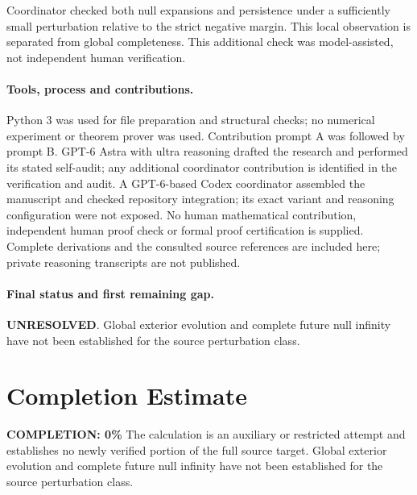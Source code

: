 \documentclass[11pt]{article}
\begin{document}
Coordinator checked both null expansions and persistence under a sufficiently small perturbation relative to the strict negative margin. This local observation is separated from global completeness. This additional check was model-assisted, not independent human verification.

\paragraph{Tools, process and contributions.}
Python 3 was used for file preparation and structural checks; no numerical experiment or theorem prover was used. Contribution prompt A was followed by prompt B. GPT-6 Astra with ultra reasoning drafted the research and performed its stated self-audit; any additional coordinator contribution is identified in the verification and audit. A GPT-6-based Codex coordinator assembled the manuscript and checked repository integration; its exact variant and reasoning configuration were not exposed. No human mathematical contribution, independent human proof check or formal proof certification is supplied. Complete derivations and the consulted source references are included here; private reasoning transcripts are not published.

\paragraph{Final status and first remaining gap.}
\textbf{UNRESOLVED}. Global exterior evolution and complete future null infinity have not been established for the source perturbation class.

\section{Completion Estimate}
\noindent\textbf{COMPLETION: 0\%}
The calculation is an auxiliary or restricted attempt and establishes no newly verified portion of the full source target. Global exterior evolution and complete future null infinity have not been established for the source perturbation class.
\end{document}
